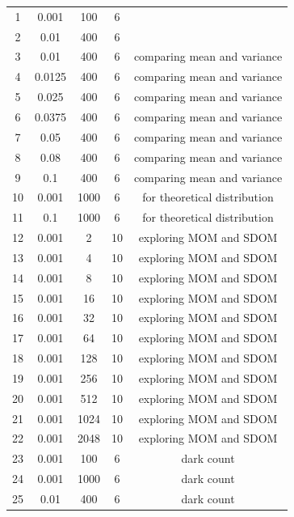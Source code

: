 \documentclass[a4paper,12pt]{article}
\begin{document}
\begin{table}[H]
\begin{tabular}{ccccc}
 
\hline
\hline
1   &   0.001   &   100     &   6   & \\
2   &   0.01    &   400     &   6   & \\
3   &   0.01    &   400     &   6   & comparing mean and variance \\
4   &   0.0125  &   400     &   6   & comparing mean and variance \\
5   &   0.025   &   400     &   6   & comparing mean and variance \\
6   &   0.0375  &   400     &   6   & comparing mean and variance \\
7   &   0.05    &   400     &   6   & comparing mean and variance \\
8   &   0.08    &   400     &   6   & comparing mean and variance \\
9   &   0.1     &   400     &   6   & comparing mean and variance \\
10  &   0.001   &   1000    &   6   & for theoretical distribution\\
11  &   0.1     &   1000    &   6   & for theoretical distribution\\
12  &   0.001   &   2       &   10  & exploring MOM and SDOM\\
13  &   0.001   &   4       &   10  & exploring MOM and SDOM\\
14  &   0.001   &   8       &   10  & exploring MOM and SDOM\\
15  &   0.001   &   16      &   10  & exploring MOM and SDOM\\
16  &   0.001   &   32      &   10  & exploring MOM and SDOM\\
17  &   0.001   &   64      &   10  & exploring MOM and SDOM\\
18  &   0.001   &   128     &   10  & exploring MOM and SDOM\\
19  &   0.001   &   256     &   10  & exploring MOM and SDOM\\
20  &   0.001   &   512     &   10  & exploring MOM and SDOM\\
21  &   0.001   &   1024    &   10  & exploring MOM and SDOM\\
22  &   0.001   &   2048    &   10  & exploring MOM and SDOM\\
23  &   0.001   &   100     &   6   & dark count\\
24  &   0.001   &   1000    &   6   & dark count\\
25  &   0.01    &   400     &   6   & dark count\\
\hline
\hline

\end{tabular}
\label{table:dataset} %
\end{table}
\end{document}
